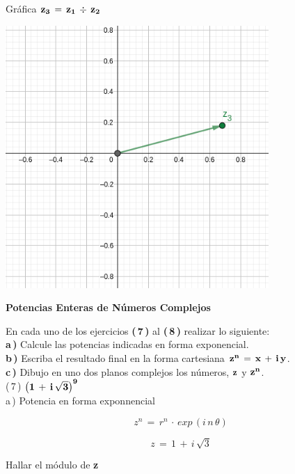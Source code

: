 \documentclass[a4paper,11pt,openany]{book}
\begin{document}
\textcolor{ao(english)}{} Gráfica $\bf{z_{3}\,=\,z_{1}\,\div\,z_{2}}$

\begin{center}
    \includegraphics[width=10cm]{Gra-Ej-6-2.png}
\end{center}

\begin{center}
\textbf{Potencias Enteras de Números Complejos}
\end{center}

En cada uno de los ejercicios \textbf{(\,7\,)} al \textbf{(\,8\,)} realizar lo siguiente:\\

\textbf{a\,)} Calcule las potencias indicadas en forma exponencial.\\

\textbf{b\,)} Escriba el resultado final en la forma cartesiana $\bf{z^{n}\,=\,x\,+\,i\,y}$.\\

\textbf{c\,)} Dibujo en uno dos planos complejos los números, $\bf{z}$ y $\bf{z^{n}}$.\\

\textcolor{ao(english)}{(\,7\,)} $\bf{\left(1\,+\,i\,\sqrt{3}\right)^{9}}$\\

\textcolor{ao(english)}{a\,)} Potencia en forma exponnencial

$$z^{n}\,=\,r^{n}\,\cdot\,exp\,(i\,n\,\theta)$$

$$z\,=\,1\,+\,i\,\sqrt{3}$$

\textcolor{ao(english)}{} Hallar el módulo de \textbf{z}
\end{document}
